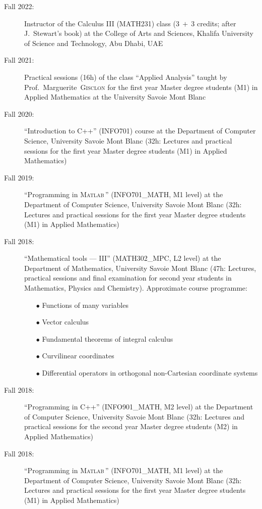 \begin{description}
        \item[Fall 2022:] Instructor of the Calculus III (MATH231) class ($3\ +\ 3$ credits; after J.~Stewart's book) at the College of Arts and Sciences, Khalifa University of Science and Technology, Abu Dhabi, UAE
        \item[Fall 2021:] Practical sessions (16h) of the class ``Applied Analysis'' taught by Prof.~Marguerite~\textsc{Gisclon} for the first year Master degree students (M1) in Applied Mathematics at the University Savoie Mont Blanc
        \item[Fall 2020:] ``Introduction to C++'' (INFO701) course at the Department of Computer Science, University Savoie Mont Blanc (32h: Lectures and practical sessions for the first year Master degree students (M1) in Applied Mathematics)
        \item[Fall 2019:] ``Programming in \textsc{Matlab}\texttrademark\,'' (INFO701\_MATH, M1 level) at the Department of Computer Science, University Savoie Mont Blanc (32h: Lectures and practical sessions for the first year Master degree students (M1) in Applied Mathematics)
        \item[Fall 2018:] ``Mathematical tools --- III'' (MATH302\_MPC, L2 level) at the Department of Mathematics, University Savoie Mont Blanc (47h: Lectures, practical sessions and final examination for second year students in Mathematics, Physics and Chemistry). Approximate course programme:
        \begin{itemize}
            \item[$\bullet$] Functions of many variables
            \item[$\bullet$] Vector calculus
            \item[$\bullet$] Fundamental theorems of integral calculus
            \item[$\bullet$] Curvilinear coordinates
            \item[$\bullet$] Differential operators in orthogonal non-Cartesian coordinate systems
        \end{itemize}
        \item[Fall 2018:] ``Programming in C++'' (INFO901\_MATH, M2 level) at the Department of Computer Science, University Savoie Mont Blanc (32h: Lectures and practical sessions for the second year Master degree students (M2) in Applied Mathematics)
        \item[Fall 2018:] ``Programming in \textsc{Matlab}\texttrademark\,'' (INFO701\_MATH, M1 level) at the Department of Computer Science, University Savoie Mont Blanc (32h: Lectures and practical sessions for the first year Master degree students (M1) in Applied Mathematics)

\end{description}
